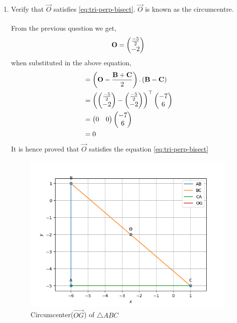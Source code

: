 \documentclass[11pt]{book}
\begin{document}
\begin{enumerate}[label=\thesection.\arabic*.,ref=\thesection.\theenumi]
\item Verify that $\vec{O}$ satisfies
			\eqref{eq:tri-perp-bisect}.
$\vec{O}$ is known as the circumcentre.\\
\solution\\
 From the previous question we get,
 \begin{align}
	\mathbf{O} = \begin{pmatrix}\frac{-5}{2} \\ -2\end{pmatrix}
\end{align}
when substituted in the above equation,
\begin{align}
	&= \left(\mathbf{O}-\frac{\mathbf{B}+\mathbf{C}}{2}\right).\left(\mathbf{B}-\mathbf{C}\right)\\
	&= \left(\begin{pmatrix}\frac{-5}{2} \\ -2\end{pmatrix}- \begin{pmatrix}\frac{-5}{2} \\ -2\end{pmatrix}\right)^{\top} \begin{pmatrix}-7 \\ 6\end{pmatrix}\\
	&= \begin{pmatrix}0 & 0\end{pmatrix}\begin{pmatrix}-7 \\ 6\end{pmatrix}\\
	&= 0
\end{align}
It is hence proved that $\vec{O}$ satisfies the equation \eqref{eq:tri-perp-bisect}
\begin{figure}[H]                                         
	\includegraphics[width=\columnwidth]{figs/OG.png}
	\caption{Circumcenter($\vec{OG}$) of $\triangle ABC$}
\label{fig:circumcenter OG}      
\end{figure}


\end{enumerate}
\end{document}
